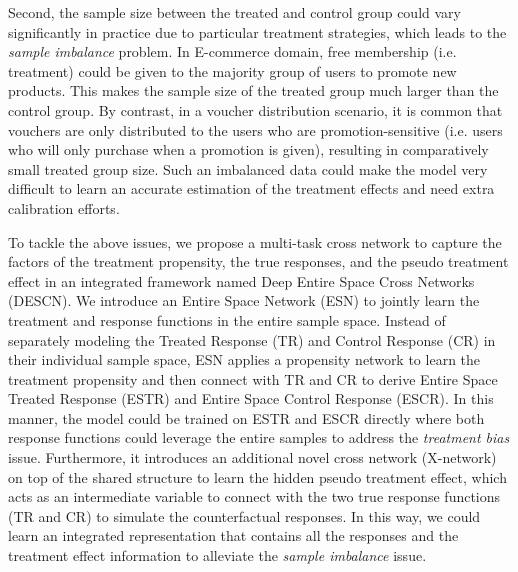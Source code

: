 \documentclass[sigconf]{acmart}
\begin{document}
Second, the sample size between the treated and control group could vary significantly in practice due to particular treatment strategies, which leads to the \textit{sample imbalance} problem. In E-commerce domain, free membership (i.e. treatment) could be given to the majority group of users to promote new products. This makes the sample size of the treated group much larger than the control group. By contrast, in a voucher distribution scenario, it is common that vouchers are only distributed to the users who are promotion-sensitive (i.e. users who will only purchase when a promotion is given), resulting in comparatively small treated group size. Such an imbalanced data could make the model very difficult to learn an accurate estimation of the treatment effects and need extra calibration efforts.

To tackle the above issues, we propose a multi-task cross network to capture the factors of the treatment propensity, the true responses, and the pseudo treatment effect in an integrated framework named Deep Entire Space Cross Networks (DESCN). We introduce an Entire Space Network (ESN) to jointly learn the treatment and response functions in the entire sample space. Instead of separately modeling the Treated Response (TR) and Control Response (CR) in their individual sample space, ESN applies a propensity network to learn the treatment propensity and then connect with TR and CR to derive Entire Space Treated Response (ESTR) and Entire Space Control Response (ESCR). In this manner, the model could be trained on ESTR and ESCR directly where both response functions could leverage the entire samples to address the \textit{treatment bias} issue. Furthermore, it introduces an additional novel cross network (X-network) on top of the shared structure to learn the hidden pseudo treatment effect, which acts as an intermediate variable to connect with the two true response functions (TR and CR) to simulate the counterfactual responses. In this way, we could learn an integrated representation that contains all the responses and the treatment effect information to alleviate the \textit{sample imbalance} issue. 
\end{document}
